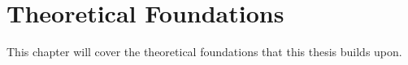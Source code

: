 \chapter{Theoretical Foundations}
\label{ch:foundations}
This chapter will cover the theoretical foundations that this thesis builds upon.
